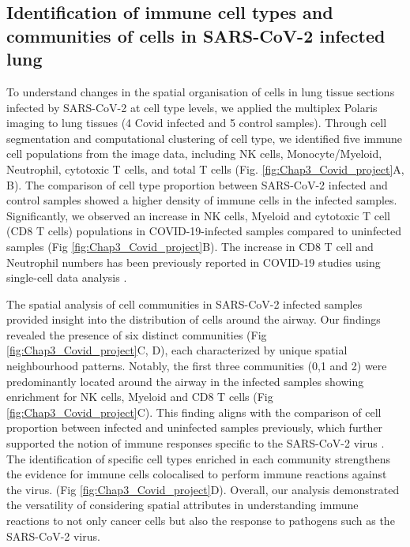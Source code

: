 \subsection{Identification of immune cell types and communities of cells in SARS-CoV-2 infected lung}
To understand changes in the spatial organisation of cells in lung tissue sections infected by SARS-CoV-2 at cell type levels, we applied the multiplex Polaris imaging to lung tissues (4 Covid infected and 5 control samples). Through cell segmentation and computational clustering of cell type, we identified five immune cell populations from the image data,  including NK cells, Monocyte/Myeloid, Neutrophil, cytotoxic T cells, and total T cells (Fig. \ref{fig:Chap3_Covid_project}A, B). The comparison of cell type proportion between SARS-CoV-2 infected and control samples showed a higher density of immune cells in the infected samples. Significantly, we observed an increase in NK cells, Myeloid and cytotoxic T cell (CD8 T cells) populations in COVID-19-infected samples compared to uninfected samples (Fig \ref{fig:Chap3_Covid_project}B). The increase in CD8 T cell and Neutrophil numbers has been previously reported in COVID-19 studies using single-cell data analysis \cite{stephenson2021single}.  

The spatial analysis of cell communities in SARS-CoV-2 infected samples provided insight into the distribution of cells around the airway. Our findings revealed the presence of six distinct communities (Fig \ref{fig:Chap3_Covid_project}C, D), each characterized by unique spatial neighbourhood patterns. Notably, the first three communities (0,1 and 2) were predominantly located around the airway in the infected samples showing enrichment for NK cells, Myeloid and CD8 T cells (Fig \ref{fig:Chap3_Covid_project}C). This finding aligns with the comparison of cell proportion between infected and uninfected samples previously, which further supported the notion of immune responses specific to the SARS-CoV-2 virus \cite{stephenson2021single}. The identification of specific cell types enriched in each community strengthens the evidence for immune cells colocalised to perform immune reactions against the virus. (Fig \ref{fig:Chap3_Covid_project}D). Overall, our analysis demonstrated the versatility of considering spatial attributes in understanding immune reactions to not only cancer cells but also the response to pathogens such as the SARS-CoV-2 virus. 


